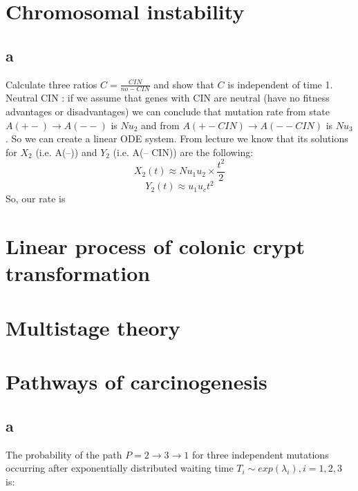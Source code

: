 \newcommand{\package}{\emph}

\setcounter{chapter}{1}
\setcounter{section}{0}
\section{Chromosomal instability}
\subsection{a}
Calculate three ratios $C= \frac{CIN}{no-CIN}$ and show that $C$ is independent of time
1.	Neutral CIN : if we assume that genes with CIN are neutral (have no fitness advantages or disadvantages) we can conclude that mutation rate from state $A(+-) \rightarrow A(--)$ is $Nu_2$ and from $A (+- CIN) \rightarrow A(-- CIN)$ is $Nu_3$. So we can create a linear ODE system. 
From lecture we know that its solutions for  $X_2$ (i.e. A(--)) and $Y_2$ (i.e. A(-- CIN)) are the following:
\[X_2(t) \approx Nu_1u_2 \times \frac{t^2}{2} \]
\[Y_2(t) \approx u_1u_ct^2\]
So, our rate is


\setcounter{chapter}{2}
\setcounter{section}{0}
\section{Linear process of colonic crypt transformation}

\setcounter{chapter}{3}
\setcounter{section}{0}
\section{Multistage theory}

\setcounter{chapter}{4}
\setcounter{section}{0}
\section{Pathways of carcinogenesis}
\subsection{a}
The probability of the path $ P = 2 \rightarrow 3 \rightarrow 1 $ for three independent mutations occurring after exponentially distributed waiting time $T_i \sim exp(\lambda_i), i = 1,2,3$ is:

